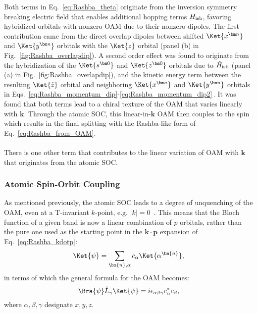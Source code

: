 Both terms in Eq.~\eqref{eq:Rashba_theta} originate from the inversion symmetry breaking electric field that enables additional hopping terms $H_{\rm isb}$, favoring hybridized orbitals with nonzero OAM due to their nonzero dipoles. 
The first contribution came from the direct overlap dipoles between shifted $\Ket{x^{\bm n}}$ and $\Ket{y^{\bm n}}$ orbitals with the $\Ket{z}$ orbital (panel (b) in Fig.~\ref{fig:Rashba_overlapdip})\cite{Petersen2000}.
A second order effect was found to originate from the hybridization of the $\Ket{s^{\bm 0}}$ and $\Ket{z^{\bm 0}}$ orbitals due to $\hat H_{\rm isb}$ (panel (a) in Fig.~\ref{fig:Rashba_overlapdip}), and the kinetic energy term between the resulting $\Ket{\tilde z}$ orbital and neighboring $\Ket{x^{\bm n}}$ and $\Ket{y^{\bm n}}$ orbitals in Eqs.~\eqref{eq:Rashba_momentum_dip}-\eqref{eq:Rashba_momentum_dip2}\,\cite{Go2016}.
It was found that both terms lead to a chiral texture of the OAM that varies linearly with $\bm k$.
Through the atomic SOC, this linear-in-$\bm k$ OAM then couples to the spin which results in the final splitting with the Rashba-like form of Eq.~\eqref{eq:Rashba_from_OAM}.
\\\\
There is one other term that contributes to the linear variation of OAM with $\bm{k}$ that originates from the atomic SOC.

\subsubsection{Atomic Spin-Orbit Coupling \label{sec:Rashba_SOC_part}}
As mentioned previously, the atomic SOC leads to a degree of unquenching of the OAM, even at a T-invariant $k$-point, e.g. $|k|=0$~\cite{Park2011,Park2012,Park2015}.
This means that the Bloch function of a given band is now a linear combination of $p$ orbitals, rather than the pure one used as the starting point in the $\bm k \cdot \bm p$ expansion of Eq.~\eqref{eq:Rashba_kdotp}:
\begin{equation}
\Ket{\psi} = \sum_{\bm{n},\alpha} c_\alpha \Ket{\alpha^{\bm{n}}},
\end{equation}
in terms of which the general formula for the OAM becomes:
\begin{equation}
	\Bra{\psi}\hat L_{\gamma}\Ket{\psi}= i \epsilon_{\alpha \beta \gamma} c^*_\alpha c_\beta,
\end{equation}
where $\alpha,\beta,\gamma$ designate $x,y,z$.

